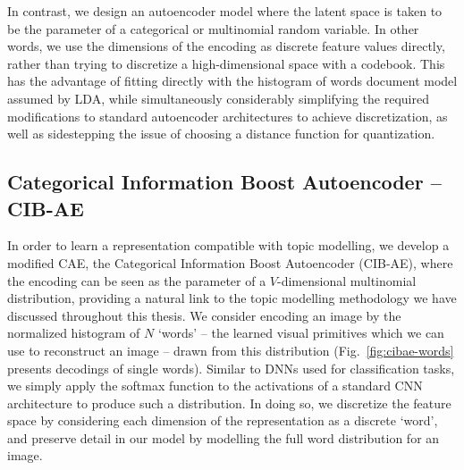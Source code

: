 In contrast, we design an autoencoder model where the latent space is taken to be the parameter of a categorical or multinomial random variable. In other words, we use the dimensions of the encoding as discrete feature values directly, rather than trying to discretize a high-dimensional space with a codebook. This has the advantage of fitting directly with the histogram of words document model assumed by LDA, while simultaneously considerably simplifying the required modifications to standard autoencoder architectures to achieve discretization, as well as sidestepping the issue of choosing a distance function for quantization.

\subsection{Categorical Information Boost Autoencoder -- CIB-AE}

In order to learn a representation compatible with topic modelling, we develop a modified CAE, the Categorical Information Boost Autoencoder (CIB-AE), where the encoding can be seen as the parameter of a $V$-dimensional multinomial distribution, providing a natural link to the topic modelling methodology we have discussed throughout this thesis. We consider encoding an image by the normalized histogram of $N$ `words' -- the learned visual primitives which we can use to reconstruct an image -- drawn from this distribution (Fig.~\ref{fig:cibae-words} presents decodings of single words). Similar to DNNs used for classification tasks, we simply apply the softmax function to the activations of a standard CNN architecture to produce such a distribution. In doing so, we discretize the feature space by considering each dimension of the representation as a discrete `word', and preserve detail in our model by modelling the full word distribution for an image.

